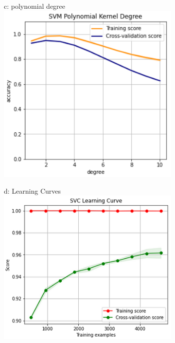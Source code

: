 \documentclass{article}
\begin{document}
\begin{figure}
\begin{subfigure}{.32\textwidth}
	\end{subfigure}
	\begin{subfigure}{.32\textwidth}
		\centering
		c: polynomial degree\\
		\includegraphics[width=\linewidth]{mnist_svm_poly_degree.png}
		
	\end{subfigure}
	\begin{subfigure}{.34\textwidth}
		\centering
		d: Learning Curves\\
		\includegraphics[width=\linewidth]{mnist_svm_learning.png}
		
	\end{subfigure}
	\label{fig:test}
\end{figure}
\end{document}
